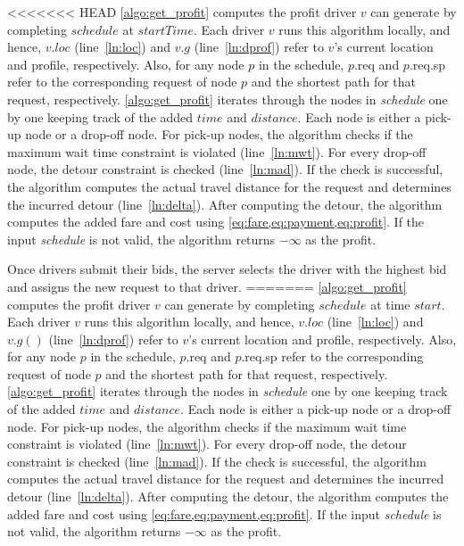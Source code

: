 \begin{algorithm}
\begin{algorithmic}[1]
<<<<<<< HEAD
\cref{algo:get_profit} computes the profit driver $v$ can generate by completing $schedule$ at $startTime$. Each driver $v$ runs this algorithm locally, and hence, $v.loc$ (line~\ref{ln:loc}) and $v.g$ (line~\ref{ln:dprof}) refer to $v$'s current location and profile, respectively. Also, for any node $p$ in the schedule, $p$.req and $p$.req.sp refer to the corresponding request of node $p$ and the shortest path for that request, respectively. \cref{algo:get_profit} iterates through the nodes in \textit{schedule} one by one keeping track of the added $time$ and $distance$. Each node is either a pick-up node or a drop-off node. For pick-up nodes, the algorithm checks if the maximum wait time constraint is violated (line~\ref{ln:mwt}). For every drop-off node, the detour constraint is checked (line~\ref{ln:mad}). If the check is successful, the algorithm computes the actual travel distance for the request and determines the incurred detour (line~\ref{ln:delta}). After computing the detour, the algorithm computes the added fare and cost using \cref{eq:fare,eq:payment,eq:profit}. If the input \textit{schedule} is not valid, the algorithm returns $-\infty$ as the profit.

Once drivers submit their bids, the server selects the driver with the highest bid and assigns the new request to that driver.
=======
\cref{algo:get_profit} computes the profit driver $v$ can generate by completing $schedule$ at time $start$. Each driver $v$ runs this algorithm locally, and hence, $v.loc$ (line~\ref{ln:loc}) and $v.g()$ (line~\ref{ln:dprof}) refer to $v$'s current location and profile, respectively. Also, for any node $p$ in the schedule, $p$.req and $p$.req.sp refer to the corresponding request of node $p$ and the shortest path for that request, respectively. \cref{algo:get_profit} iterates through the nodes in \textit{schedule} one by one keeping track of the added $time$ and $distance$. Each node is either a pick-up node or a drop-off node. For pick-up nodes, the algorithm checks if the maximum wait time constraint is violated (line~\ref{ln:mwt}). For every drop-off node, the detour constraint is checked (line~\ref{ln:mad}). If the check is successful, the algorithm computes the actual travel distance for the request and determines the incurred detour (line~\ref{ln:delta}). After computing the detour, the algorithm computes the added fare and cost using \cref{eq:fare,eq:payment,eq:profit}. If the input \textit{schedule} is not valid, the algorithm returns $-\infty$ as the profit.


\end{algorithmic}
\end{algorithm}
